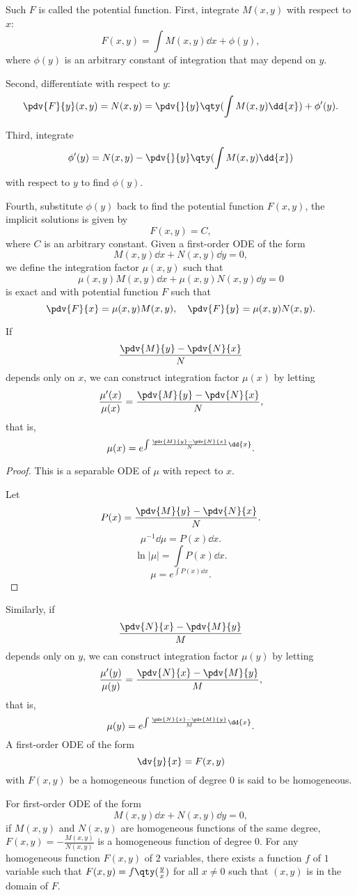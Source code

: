 \documentclass[a4paper,12pt]{report}
\begin{document}
Such $F$ is called the potential function.
First, integrate $M(x,y)$ with respect to $x$:
\[F(x,y)=\int M(x,y)\dd{x}+\phi(y),\]
where $\phi(y)$ is an arbitrary constant of integration that may depend on $y$.

Second, differentiate with respect to $y$:
\[\pdv{F}{y}(x,y)=N(x,y)=\pdv{}{y}\qty(\int M(x,y)\dd{x})+\phi'(y).\]

Third, integrate
\[\phi'(y)=N(x,y)-\pdv{}{y}\qty(\int M(x,y)\dd{x})\]
with respect to $y$ to find $\phi(y)$.

Fourth, substitute $\phi(y)$ back to find the potential function $F(x,y)$, the implicit solutions is given by
\[F(x,y)=C,\]
where $C$ is an arbitrary constant.
Given a first-order ODE of the form
\[M(x,y)\dd{x}+N(x,y)\dd{y}=0,\]
we define the integration factor $\mu(x,y)$ such that
\[\mu(x,y)M(x,y)\dd{x}+\mu(x,y)N(x,y)\dd{y}=0\]
is exact and with potential function $F$ such that
\[\pdv{F}{x}=\mu(x,y)M(x,y),\quad\pdv{F}{y}=\mu(x,y)N(x,y).\]

If
\[\frac{\pdv{M}{y}-\pdv{N}{x}}{N}\]
depends only on $x$, we can construct integration factor $\mu(x)$ by letting
\[\frac{\mu'(x)}{\mu(x)}=\frac{\pdv{M}{y}-\pdv{N}{x}}{N},\]
that is,
\[\mu(x)=e^{\int\frac{\pdv{M}{y}-\pdv{N}{x}}{N}\dd{x}}.\]
\begin{proof}
This is a separable ODE of $\mu$ with repect to $x$.

Let
\[P(x)=\frac{\pdv{M}{y}-\pdv{N}{x}}{N}.\]
\[\mu^{-1}\dd{\mu}=P(x)\dd{x}.\]
\[\ln|\mu|=\int P(x)\dd{x}.\]
\[\mu=e^{\int P(x)\dd{x}}.\]
\end{proof}

Similarly, if
\[\frac{\pdv{N}{x}-\pdv{M}{y}}{M}\]
depends only on $y$, we can construct integration factor $\mu(y)$ by letting
\[\frac{\mu'(y)}{\mu(y)}=\frac{\pdv{N}{x}-\pdv{M}{y}}{M},\]
that is,
\[\mu(y)=e^{\int\frac{\pdv{N}{x}-\pdv{M}{y}}{M}\dd{x}}.\]
A first-order ODE of the form
\[\dv{y}{x}=F(x,y)\]
with $F(x,y)$ be a homogeneous function of degree $0$ is said to be homogeneous. 

For first-order ODE of the form
\[M(x,y)\dd{x}+N(x,y)\dd{y}=0,\]
if $M(x,y)$ and $N(x,y)$ are homogeneous functions of the same degree, $F(x,y)=-\frac{M(x,y)}{N(x,y)}$ is a homogeneous function of degree $0$.
For any homogeneous function $F(x,y)$ of $2$ variables, there exists a function $f$ of $1$ variable such that $F(x,y)=f\qty(\frac{y}{x})$ for all $x\neq 0$ such that $(x,y)$ is in the domain of $F$.
\end{document}
